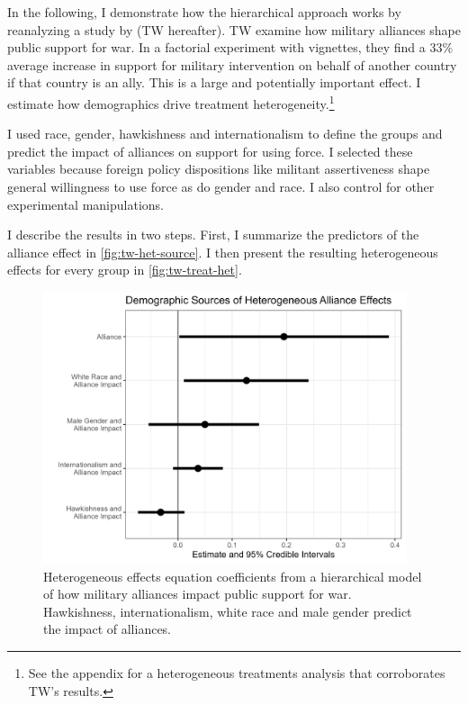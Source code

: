 \documentclass[12pt]{article}
\begin{document}
In the following, I demonstrate how the hierarchical approach works by reanalyzing a study by \citet{TomzWeeks2021} (TW hereafter). 
TW examine how military alliances shape public support for war.
In a factorial experiment with vignettes, they find a 33\% average increase in support for military intervention on behalf of another country if that country is an ally. 
This is a large and potentially important effect. 
I estimate how demographics drive treatment heterogeneity.\footnote{See the appendix for a heterogeneous treatments analysis that corroborates TW's results.}


I used race, gender, hawkishness and internationalism to define the groups and predict the impact of alliances on support for using force. 
I selected these variables because foreign policy dispositions like militant assertiveness shape general willingness to use force \citep{Kertzeretal2014} as do gender \citep{Barnhartetal2020} and race. 
I also control for other experimental manipulations. 


I describe the results in two steps. 
First, I summarize the predictors of the alliance effect in \autoref{fig:tw-het-source}.
I then present the resulting heterogeneous effects for every group in \autoref{fig:tw-treat-het}.


\begin{figure}[htpb]
	\centering
		\includegraphics[width=0.95\textwidth]{../figures/tw-het-source.png}
	\caption{Heterogeneous effects equation coefficients from a hierarchical model of how military alliances impact public support for war. Hawkishness, internationalism, white race and male gender predict the impact of alliances.}
	\label{fig:tw-het-source}
\end{figure}
\end{document}

